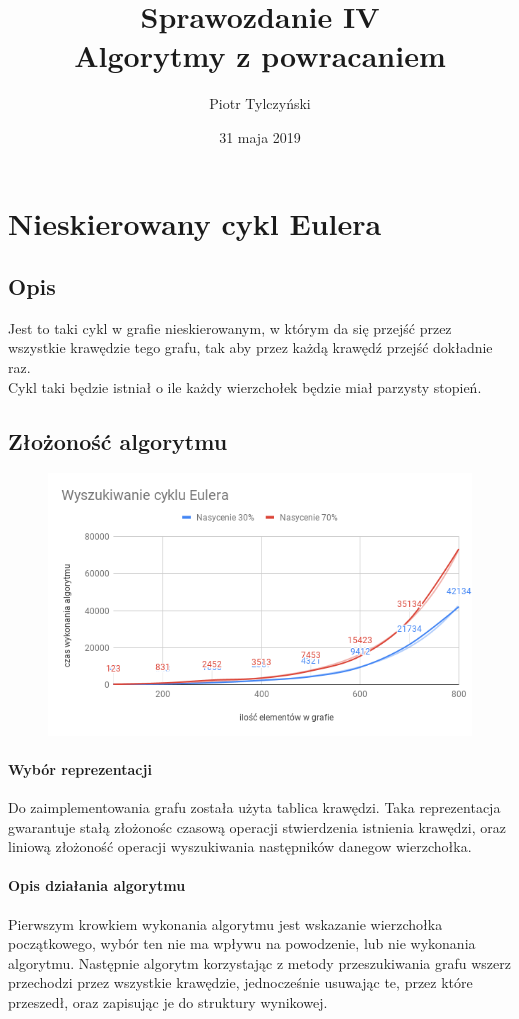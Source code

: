 \documentclass[]{article}
\title{{\normalsize Sprawozdanie IV} \\
		{\Huge Algorytmy z powracaniem}}
\author{Piotr Tylczyński}
\date{31 maja 2019}
\begin{document}
\maketitle
\clearpage

\tableofcontents
\clearpage

\section{Nieskierowany cykl Eulera}
	\subsection{Opis}
		Jest to taki cykl w grafie nieskierowanym, w którym da się przejść przez wszystkie krawędzie tego grafu, tak aby przez każdą krawędź przejść dokładnie raz. \\
		Cykl taki będzie istniał o ile każdy wierzchołek będzie miał parzysty stopień.
	
	\subsection{Złożoność algorytmu}
		\begin{figure}[H]
			\includegraphics[scale=0.6]{euler.png}
		\end{figure}
		\paragraph{Wybór reprezentacji}
		Do zaimplementowania grafu została użyta tablica krawędzi. Taka reprezentacja gwarantuje stałą złożonośc czasową operacji stwierdzenia istnienia krawędzi, oraz liniową złożoność operacji wyszukiwania następników danegow wierzchołka.
		
		\paragraph{Opis działania algorytmu} Pierwszym krowkiem wykonania algorytmu jest wskazanie wierzchołka początkowego, wybór ten nie ma wpływu na powodzenie, lub nie wykonania algorytmu. Następnie algorytm korzystając z metody przeszukiwania grafu wszerz przechodzi przez wszystkie krawędzie, jednocześnie usuwając te, przez które przeszedł, oraz zapisując je do struktury wynikowej.
		
\end{document}
